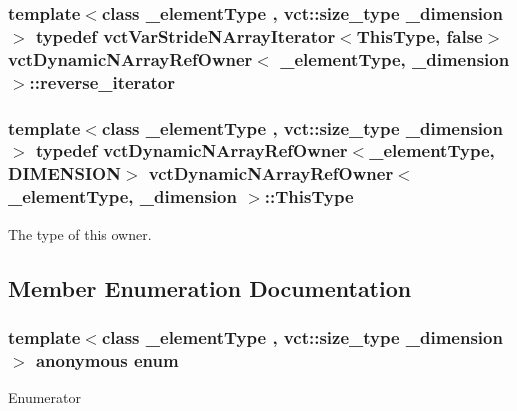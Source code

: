 \subsubsection[{reverse\+\_\+iterator}]{\setlength{\rightskip}{0pt plus 5cm}template$<$class \+\_\+element\+Type , vct\+::size\+\_\+type \+\_\+dimension$>$ typedef {\bf vct\+Var\+Stride\+N\+Array\+Iterator}$<${\bf This\+Type}, false$>$ {\bf vct\+Dynamic\+N\+Array\+Ref\+Owner}$<$ \+\_\+element\+Type, \+\_\+dimension $>$\+::{\bf reverse\+\_\+iterator}}\label{classvct_dynamic_n_array_ref_owner_aabd87b1efc3a18043c6dac3d8017be59}
\hypertarget{classvct_dynamic_n_array_ref_owner_acd225aa6d3759b053ed4ab7ca6026989}{}
\subsubsection[{This\+Type}]{\setlength{\rightskip}{0pt plus 5cm}template$<$class \+\_\+element\+Type , vct\+::size\+\_\+type \+\_\+dimension$>$ typedef {\bf vct\+Dynamic\+N\+Array\+Ref\+Owner}$<$\+\_\+element\+Type, {\bf D\+I\+M\+E\+N\+S\+I\+O\+N}$>$ {\bf vct\+Dynamic\+N\+Array\+Ref\+Owner}$<$ \+\_\+element\+Type, \+\_\+dimension $>$\+::{\bf This\+Type}}\label{classvct_dynamic_n_array_ref_owner_acd225aa6d3759b053ed4ab7ca6026989}
The type of this owner. 

\subsection{Member Enumeration Documentation}
\hypertarget{classvct_dynamic_n_array_ref_owner_a80e01cf6b29f06f8909c10a950de8878}{}\subsubsection[{anonymous enum}]{\setlength{\rightskip}{0pt plus 5cm}template$<$class \+\_\+element\+Type , vct\+::size\+\_\+type \+\_\+dimension$>$ anonymous enum}\label{classvct_dynamic_n_array_ref_owner_a80e01cf6b29f06f8909c10a950de8878}
\begin{Desc}
\item[Enumerator]\par
\begin{description}
\item[{\em 
\hypertarget{classvct_dynamic_n_array_ref_owner_a80e01cf6b29f06f8909c10a950de8878a189e6a50792859079c88592f0c2ab19b}{}D\+I\+M\+E\+N\+S\+I\+O\+N\label{classvct_dynamic_n_array_ref_owner_a80e01cf6b29f06f8909c10a950de8878a189e6a50792859079c88592f0c2ab19b}
}]\end{description}
\end{Desc}


